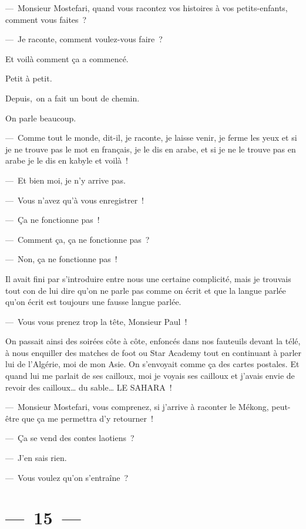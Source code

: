 \documentclass[french,twoside]{book} %
\begin{document}
— Monsieur Mostefari, quand vous racontez vos histoires à vos petits-enfants, comment vous faites ?\par
— Je raconte, comment voulez-vous faire ?\par
Et voilà comment ça a commencé.\par
Petit à petit.\par
Depuis, on a fait un bout de chemin.\par
On parle beaucoup.\par
— Comme tout le monde, dit-il, je raconte, je laisse venir, je ferme les yeux et si je ne trouve pas le mot en français, je le dis en arabe, et si je ne le trouve pas en arabe je le dis en kabyle et voilà !\par
— Et bien moi, je n’y arrive pas.\par
— Vous n’avez qu’à vous enregistrer !\par
— Ça ne fonctionne pas !\par
— Comment ça, ça ne fonctionne pas ?\par
— Non, ça ne fonctionne pas !\par
Il avait fini par s’introduire entre nous une certaine complicité, mais je trouvais tout con de lui dire qu’on ne parle pas comme on écrit et que la langue parlée qu’on écrit est toujours une fausse langue parlée.\par
— Vous vous prenez trop la tête, Monsieur Paul !\par
On passait ainsi des soirées côte à côte, enfoncés dans nos fauteuils devant la télé, à nous enquiller des matches de foot ou Star Academy tout en continuant à parler lui de l’Algérie, moi de mon Asie. On s’envoyait comme ça des cartes postales. Et quand lui me parlait de ses cailloux, moi je voyais ses cailloux et j’avais envie de revoir des cailloux… du sable… LE SAHARA !\par
— Monsieur Mostefari, vous comprenez, si j’arrive à raconter le Mékong, peut-être que ça me permettra d’y retourner !\par
— Ça se vend des contes laotiens ?\par
— J’en sais rien.\par
— Vous voulez qu’on s’entraîne ?

\section[{— 15 —}]{— 15 —}
\renewcommand{\leftmark}{— 15 —}
\end{document}
